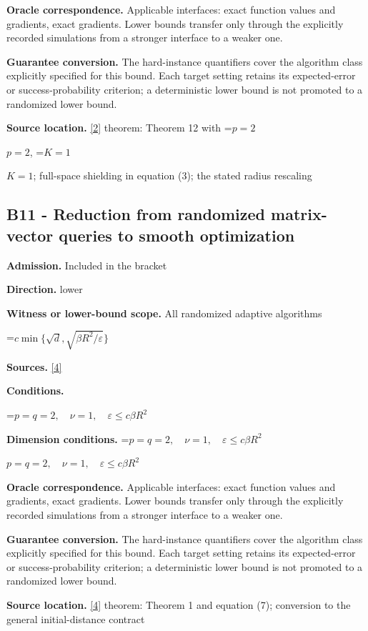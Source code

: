 \documentclass[10pt,a4paper]{article}
\newcommand{\AtlasMath}[1]{\par\begingroup\centering\setbox0=\hbox{$\displaystyle #1$}\ifdim\wd0>1.4\linewidth\typeout{ATLAS WIDE FORMULA: \the\wd0}\fi\ifdim\wd0>\linewidth\resizebox{\linewidth}{!}{\box0}\else\box0\fi\par\endgroup}
\newcommand{\AtlasInlineMath}[1]{\begingroup\setbox0=\hbox{$#1$}\ifdim\wd0>.4\linewidth\endgroup\AtlasMath{#1}\else\endgroup$#1$\fi}
\begin{document}
\textbf{Oracle correspondence.} Applicable interfaces: exact function values and gradients, exact gradients. Lower bounds transfer only through the explicitly recorded simulations from a stronger interface to a weaker one.

\textbf{Guarantee conversion.} The hard-instance quantifiers cover the algorithm class explicitly specified for this bound. Each target setting retains its expected-error or success-probability criterion; a deterministic lower bound is not promoted to a randomized lower bound.

\textbf{Source location.} \href{https://proceedings.mlr.press/v99/diakonikolas19c/diakonikolas19c.pdf}{[2]} theorem: Theorem 12 with \AtlasInlineMath{p=2}, \AtlasInlineMath{K=1}; full-space shielding in equation (3); the stated radius rescaling

\subsection{B11 - Reduction from randomized matrix-vector queries to smooth optimization}
\textbf{Admission.} Included in the bracket

\textbf{Direction.} lower

\textbf{Witness or lower-bound scope.} All randomized adaptive algorithms

\AtlasMath{c\min\{\sqrt d,\sqrt{\beta R^2/\varepsilon}\}}
\textbf{Sources.} \href{https://arxiv.org/pdf/2609.10874}{[4]}

\textbf{Conditions.} 
\AtlasMath{p=q=2,\quad\nu=1,\quad\varepsilon\le c\beta R^2}


\textbf{Dimension conditions.} \AtlasInlineMath{p=q=2,\quad\nu=1,\quad\varepsilon\le c\beta R^2}

\textbf{Oracle correspondence.} Applicable interfaces: exact function values and gradients, exact gradients. Lower bounds transfer only through the explicitly recorded simulations from a stronger interface to a weaker one.

\textbf{Guarantee conversion.} The hard-instance quantifiers cover the algorithm class explicitly specified for this bound. Each target setting retains its expected-error or success-probability criterion; a deterministic lower bound is not promoted to a randomized lower bound.

\textbf{Source location.} \href{https://arxiv.org/pdf/2609.10874}{[4]} theorem: Theorem 1 and equation (7); conversion to the general initial-distance contract
\end{document}
